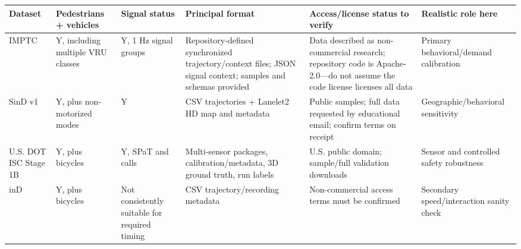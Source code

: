\documentclass[
  english,
  11pt,
  a4paper,
]{article}
\newcounter{none} %
\begin{document}
\begin{landscape}
{\def\LTcaptype{none} %
\footnotesize
\setlength{\tabcolsep}{4pt}
\begin{longtable}[]{@{}
  >{\raggedright\arraybackslash}p{}
  >{\centering\arraybackslash}p{}
  >{\centering\arraybackslash}p{}
  >{\raggedright\arraybackslash}p{}
  >{\raggedright\arraybackslash}p{}
  >{\raggedright\arraybackslash}p{}@{}}
\toprule\noalign{}
\begin{minipage}[b]{\linewidth}\raggedright
Dataset
\end{minipage} & \begin{minipage}[b]{\linewidth}\centering
Pedestrians + vehicles
\end{minipage} & \begin{minipage}[b]{\linewidth}\centering
Signal status
\end{minipage} & \begin{minipage}[b]{\linewidth}\raggedright
Principal format
\end{minipage} & \begin{minipage}[b]{\linewidth}\raggedright
Access/license status to verify
\end{minipage} & \begin{minipage}[b]{\linewidth}\raggedright
Realistic role here
\end{minipage} \\
\midrule\noalign{}
\endhead
\bottomrule\noalign{}
\endlastfoot
IMPTC & Y, including multiple VRU classes & Y, 1 Hz signal groups &
Repository-defined synchronized trajectory/context files; JSON signal
context; samples and schemas provided & Data described as non-commercial
research; repository code is Apache-2.0---do not assume the code license
licenses all data & Primary behavioral/demand calibration \\
SinD v1 & Y, plus non-motorized modes & Y & CSV trajectories + Lanelet2
HD map and metadata & Public samples; full data requested by educational
email; confirm terms on receipt & Geographic/behavioral sensitivity \\
U.S. DOT ISC Stage 1B & Y, plus bicycles & Y, SPaT and calls &
Multi-sensor packages, calibration/metadata, 3D ground truth, run labels
& U.S. public domain; sample/full validation downloads & Sensor and
controlled safety robustness \\
inD & Y, plus bicycles & Not consistently suitable for required timing &
CSV trajectory/recording metadata & Non-commercial access terms must be
confirmed & Secondary speed/interaction sanity check \\
\end{longtable}
}
\end{landscape}
\end{document}
